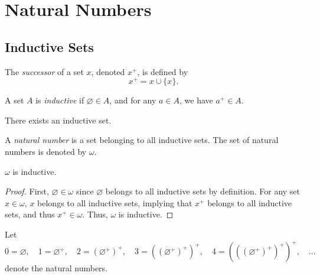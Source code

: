 \chapter{Natural Numbers}
\section{Inductive Sets}
\begin{definition}
  The \emph{successor} of a set $x$, denoted $x^+$, is defined by
  \begin{equation*}
    x^+ = x \cup \{x\}.
  \end{equation*}
\end{definition}

\begin{definition}
  A set $A$ is \emph{inductive} if $\varnothing \in A$, and for any $a \in A$,
  we have $a^+ \in A$.
\end{definition}

\begin{axiom}[Infinity]
  There exists an inductive set.
\end{axiom}

\begin{definition}
  A \emph{natural number} is a set belonging to all inductive sets.
  The set of natural numbers is denoted by $\omega$.
\end{definition}

\begin{theorem}
  $\omega$ is inductive.
\end{theorem}
\begin{proof}
  First, $\varnothing \in \omega$ since $\varnothing$ belongs to all inductive
  sets by definition.
  For any set $x \in \omega$, $x$ belongs to all inductive sets, implying that
  $x^+$ belongs to all inductive sets, and thus $x^+ \in \omega$.
  Thus, $\omega$ is inductive.
\end{proof}

\begin{definition}
  Let
  \begin{equation*}
    0 = \varnothing, \quad
    1 = \varnothing^+, \quad
    2 = (\varnothing^+)^+, \quad
    3 = ((\varnothing^+)^+)^+, \quad
    4 = (((\varnothing^+)^+)^+)^+, \quad
    \dots
  \end{equation*}
  denote the natural numbers.
\end{definition}

